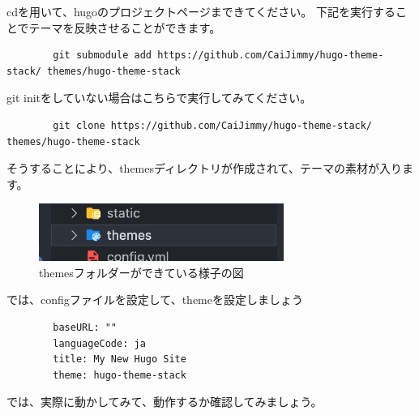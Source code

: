     cdを用いて、hugoのプロジェクトページまできてください。
    下記を実行することでテーマを反映させることができます。

    \begin{shaded}
      \begin{verbatim}
        git submodule add https://github.com/CaiJimmy/hugo-theme-stack/ themes/hugo-theme-stack
      \end{verbatim}  
    \end{shaded}

    git initをしていない場合はこちらで実行してみてください。

    \begin{shaded}
      \begin{verbatim}
        git clone https://github.com/CaiJimmy/hugo-theme-stack/ themes/hugo-theme-stack
      \end{verbatim}  
    \end{shaded}
    
    そうすることにより、themesディレクトリが作成されて、テーマの素材が入ります。

    \begin{figure}[H]
      \centering
      \includegraphics[width=8cm]{./image/02-chap5/firetree-themes.png}
      \caption{themesフォルダーができている様子の図}
      \label{chap5-firetree-themes-image}
    \end{figure}

    では、configファイルを設定して、themeを設定しましょう

    \begin{tcolorbox}[breakable]
      \begin{verbatim}
        baseURL: ""
        languageCode: ja
        title: My New Hugo Site
        theme: hugo-theme-stack
      \end{verbatim}
    \end{tcolorbox}

    では、実際に動かしてみて、動作するか確認してみましょう。

